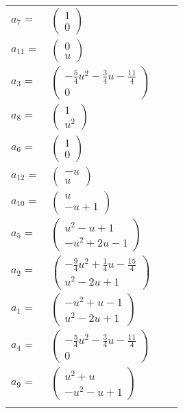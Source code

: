 \documentclass[1p]{elsarticle_modified}
\theoremstyle{definition}
\begin{document}
\begin{tabular}{m{7pt} m{180pt} m{7pt} m{180pt} }
\flushright $a_{7}=$&$\begin{pmatrix}1\\0\end{pmatrix}$ \\
\flushright $a_{11}=$&$\begin{pmatrix}0\\u\end{pmatrix}$ \\
\flushright $a_{3}=$&$\begin{pmatrix}-\frac{5}{4} u^2-\frac{3}{4} u-\frac{11}{4}\\0\end{pmatrix}$ \\
\flushright $a_{8}=$&$\begin{pmatrix}1\\u^2\end{pmatrix}$ \\
\flushright $a_{6}=$&$\begin{pmatrix}1\\0\end{pmatrix}$ \\
\flushright $a_{12}=$&$\begin{pmatrix}- u\\u\end{pmatrix}$ \\
\flushright $a_{10}=$&$\begin{pmatrix}u\\- u+1\end{pmatrix}$ \\
\flushright $a_{5}=$&$\begin{pmatrix}u^2- u+1\\- u^2+2 u-1\end{pmatrix}$ \\
\flushright $a_{2}=$&$\begin{pmatrix}-\frac{9}{4} u^2+\frac{1}{4} u-\frac{15}{4}\\u^2-2 u+1\end{pmatrix}$ \\
\flushright $a_{1}=$&$\begin{pmatrix}- u^2+u-1\\u^2-2 u+1\end{pmatrix}$ \\
\flushright $a_{4}=$&$\begin{pmatrix}-\frac{5}{4} u^2-\frac{3}{4} u-\frac{11}{4}\\0\end{pmatrix}$ \\
\flushright $a_{9}=$&$\begin{pmatrix}u^2+u\\- u^2- u+1\end{pmatrix}$\\&\end{tabular}
\end{document}
